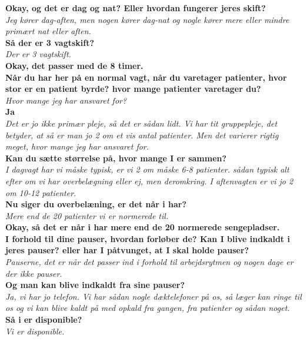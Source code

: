 \noindent
\textbf{Okay, og det er dag og nat? Eller hvordan fungerer jeres skift?} \\
\noindent
\textit{Jeg kører dag-aften, men nogen kører dag-nat og nogle kører mere eller mindre primært nat eller aften.} \\
\noindent
\textbf{Så der er 3 vagtskift?} \\
\noindent
\textit{Der er 3 vagtskift.} \\
\noindent
\textbf{Okay, det passer med de 8 timer.} \\
\noindent
\textbf{Når du har her på en normal vagt, når du varetager patienter, hvor stor er en patient byrde? hvor mange patienter varetager du?} \\
\noindent
\textit{Hvor mange jeg har ansvaret for?} \\
\noindent
\textbf{Ja} \\
\noindent
\textit{Det er jo ikke primær pleje, så det er sådan lidt. Vi har tit gruppepleje, det betyder, at så er man jo 2 om et vis antal patienter. Men det varierer rigtig meget, hvor mange jeg har ansvaret for.} \\
\noindent
\textbf{Kan du sætte størrelse på, hvor mange I er sammen?} \\
\noindent
\textit{I dagvagt har vi måske typisk, er vi 2 om måske 6-8 patienter. sådan typisk alt efter om vi har overbelægning eller ej, men deromkring. I aftenvagten er vi jo 2 om 10-12 patienter.} \\
\noindent
\textbf{Nu siger du overbelæning, er det når i har?} \\
\noindent
\textit{Mere end de 20 patienter vi er normerede til.} \\
\noindent
\textbf{Okay, så det er når i har mere end de 20 normerede sengepladser. } \\
\noindent
\textbf{I forhold til dine pauser, hvordan forløber de? Kan I blive indkaldt i jeres pauser? eller har I påtvunget, at I skal holde pauser?} \\
\noindent
\textit{Pauserne, det er når det passer ind i forhold til arbejdsrytmen og nogen dage er der ikke pauser.} \\
\noindent
\textbf{Og man kan blive indkaldt fra sine pauser?} \\
\noindent
\textit{Ja, vi har jo telefon. Vi har sådan nogle dæktelefoner på os, så læger kan ringe til os og vi kan blive kaldt på med opkald fra gangen, fra patienter og sådan noget.}
\textbf{Så i er disponible?} \\
\noindent
\textit{Vi er disponible.} \\
